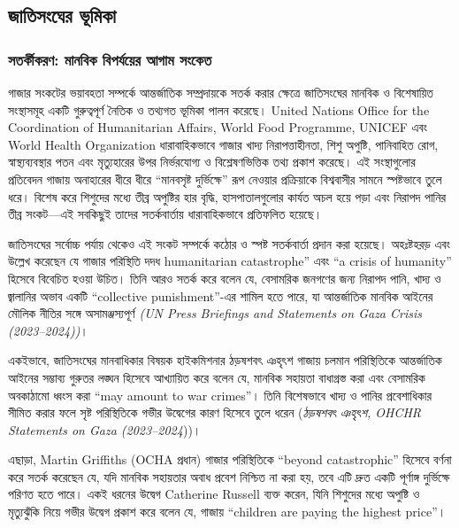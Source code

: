 \subsection{জাতিসংঘের
ভূমিকা}\label{ux99cux9a4ux9b8ux998ux9b0-ux9adux9aeux995}

\subsubsection{সতর্কীকরণ: মানবিক বিপর্যয়ের আগাম
সংকেত}\label{ux9b8ux9a4ux9b0ux995ux995ux9b0ux9a3-ux9aeux9a8ux9acux995-ux9acux9aaux9b0ux9afux9dfux9b0-ux986ux997ux9ae-ux9b8ux995ux9a4}

গাজার সংকটের ভয়াবহতা সম্পর্কে আন্তর্জাতিক সম্প্রদায়কে সতর্ক করার ক্ষেত্রে
জাতিসংঘের মানবিক ও বিশেষায়িত সংস্থাসমূহ একটি গুরুত্বপূর্ণ নৈতিক ও তথ্যগত ভূমিকা
পালন করেছে। United Nations Office for the Coordination of Humanitarian
Affairs, World Food Programme, UNICEF এবং World Health Organization
ধারাবাহিকভাবে গাজার খাদ্য নিরাপত্তাহীনতা, শিশু অপুষ্টি, পানিবাহিত রোগ,
স্বাস্থ্যব্যবস্থার পতন এবং মৃত্যুহারের উপর নির্ভরযোগ্য ও বিশ্লেষণভিত্তিক তথ্য প্রকাশ
করেছে। এই সংস্থাগুলোর প্রতিবেদন গাজায় অনাহারের ধীরে ধীরে ``মানবসৃষ্ট
দুর্ভিক্ষে'' রূপ নেওয়ার প্রক্রিয়াকে বিশ্ববাসীর সামনে স্পষ্টভাবে তুলে ধরে। বিশেষ
করে শিশুদের মধ্যে তীব্র অপুষ্টির হার বৃদ্ধি, হাসপাতালগুলোর কার্যত অচল হয়ে পড়া এবং
নিরাপদ পানির তীব্র সংকট---এই সবকিছুই তাদের সতর্কবার্তায় ধারাবাহিকভাবে
প্রতিফলিত হয়েছে।

জাতিসংঘের সর্বোচ্চ পর্যায় থেকেও এই সংকট সম্পর্কে কঠোর ও স্পষ্ট সতর্কবার্তা প্রদান
করা হয়েছে। অহঃষ্টহরড় এবং উল্লেখ করেছেন যে গাজার পরিস্থিতি দদধ
humanitarian catastrophe'' এবং ``a crisis of humanity'' হিসেবে বিবেচিত
হওয়া উচিত। তিনি আরও সতর্ক করে বলেন যে, বেসামরিক জনগণের জন্য নিরাপদ পানি,
খাদ্য ও জ্বালানির অভাব একটি ``collective punishment''-এর শামিল হতে পারে,
যা আন্তর্জাতিক মানবিক আইনের মৌলিক নীতির সঙ্গে অসামঞ্জস্যপূর্ণ \emph{(UN Press
Briefings and Statements on Gaza Crisis (2023--2024))}।

একইভাবে, জাতিসংঘের মানবাধিকার বিষয়ক হাইকমিশনার ঠড়ষশবৎ ঞহৃৎশ গাজায় চলমান
পরিস্থিতিকে আন্তর্জাতিক আইনের সম্ভাব্য গুরুতর লঙ্ঘন হিসেবে আখ্যায়িত করে বলেন যে,
মানবিক সহায়তা বাধাগ্রস্ত করা এবং বেসামরিক অবকাঠামো ধ্বংস করা ``may amount
to war crimes''। তিনি বিশেষভাবে খাদ্য ও পানির প্রবেশাধিকার সীমিত করার ফলে
সৃষ্ট পরিস্থিতিকে গভীর উদ্বেগের কারণ হিসেবে তুলে ধরেন (\emph{ঠড়ষশবৎ ঞহৃৎশ,
OHCHR Statements on Gaza (2023--2024}))।

এছাড়া, Martin Griffiths (OCHA প্রধান) গাজার পরিস্থিতিকে ``beyond
catastrophic'' হিসেবে বর্ণনা করে সতর্ক করেছেন যে, যদি মানবিক সহায়তার অবাধ
প্রবেশ নিশ্চিত না করা হয়, তবে এটি দ্রুত একটি পূর্ণাঙ্গ দুর্ভিক্ষে পরিণত হতে পারে।
একই ধরনের উদ্বেগ Catherine Russell ব্যক্ত করেন, যিনি শিশুদের মধ্যে অপুষ্টি ও
মৃত্যুঝুঁকি নিয়ে গভীর উদ্বেগ প্রকাশ করে বলেন যে, গাজায় ``children are paying
the highest price''।

